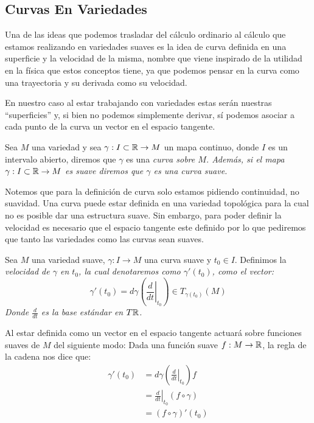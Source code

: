 \subsection{Curvas En Variedades}\label{Subsección: Curvas En Variedades}

Una de las ideas que podemos trasladar del cálculo ordinario al cálculo que estamos realizando en variedades suaves es la idea de curva definida en una superficie y la velocidad de la misma, nombre que viene inspirado de la utilidad en la física que estos conceptos tiene, ya que podemos pensar en la curva como una trayectoria y su derivada como su velocidad.

En nuestro caso al estar trabajando con variedades estas serán nuestras \enquote{superficies} y, si bien no podemos simplemente derivar, sí podemos asociar a cada punto de la curva un vector en el espacio tangente.

\begin{definition}
	Sea $M$ una variedad y sea $\gamma: I \subset \mathbb{R} \to M$ un mapa continuo, donde $I$ es un intervalo abierto, diremos que $\gamma$ es una \it{curva sobre $M$}. Además, si el mapa $\gamma: I \subset \mathbb{R} \to M$ es suave diremos que $\gamma$ es una curva suave.
\end{definition}

Notemos que para la definición de curva solo estamos pidiendo continuidad, no suavidad. Una curva puede estar definida en una variedad topológica para la cual no es posible dar una estructura suave. Sin embargo, para poder definir la velocidad es necesario que el espacio tangente este definido por lo que pediremos que tanto las variedades como las curvas sean suaves.

\begin{definition}
	Sea $M$ una variedad suave, $\gamma: I \to M$ una curva suave y $t_0 \in I$. Definimos la \it{velocidad de $\gamma$ en $t_0$}, la cual denotaremos como $\gamma'(t_0)$, como el vector:
	\[
		\gamma'(t_0) = d\gamma\left(\left. \frac{d}{dt}\right|_{t_0}\right)
		\in T_{\gamma(t_0)}(M)
	\]
	Donde $\frac{d}{dt}$ es la base estándar en $T\mathbb{R}$.
\end{definition}

Al estar definida como un vector en el espacio tangente actuará sobre funciones suaves de $M$ del siguiente modo: Dada una función suave $f: M \to \mathbb{R}$, la regla de la cadena nos dice que:
\begin{align*}
	\gamma'(t_0) & =d\gamma\left(\left.\frac{d}{dt}\right|_{t_0} \right)f \\
	             & = \left. \frac{d}{dt} \right|_{t_0} (f \circ \gamma)   \\
	             & = (f \circ \gamma)' (t_0)
\end{align*}

